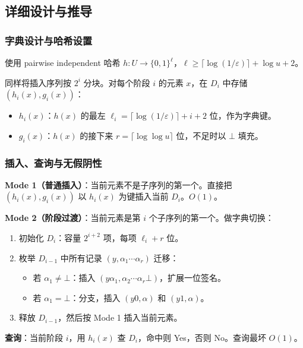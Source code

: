 \documentclass[UTF8,11pt,a4paper]{ctexart}
\begin{document}
\subsection{详细设计与推导}

\subsubsection{字典设计与哈希设置}

使用 pairwise independent 哈希 $h: U \to \{0,1\}^\ell$，$\ell \ge \lceil\log(1/\varepsilon)\rceil + \log u + 2$。

同样将插入序列按 $2^i$ 分块。对每个阶段 $i$ 的元素 $x$，在 $D_i$ 中存储 $(h_i(x), g_i(x))$：
\begin{itemize}
    \item $h_i(x)$：$h(x)$ 的最左 $\ell_i = \lceil\log(1/\varepsilon)\rceil + i + 2$ 位，作为字典键。
    \item $g_i(x)$：$h(x)$ 的接下来 $r = \lceil\log\log u\rceil$ 位，不足时以 $\bot$ 填充。
\end{itemize}

\subsubsection{插入、查询与无假阴性}

\textbf{Mode 1（普通插入）}：当前元素不是子序列的第一个。直接把 $(h_i(x), g_i(x))$ 以 $h_i(x)$ 为键插入当前 $D_i$。$O(1)$。

\textbf{Mode 2（阶段过渡）}：当前元素是第 $i$ 个子序列的第一个。做字典切换：
\begin{enumerate}
    \item 初始化 $D_i$：容量 $2^{i+2}$ 项，每项 $\ell_i + r$ 位。
    \item 枚举 $D_{i-1}$ 中所有记录 $(y, \alpha_1\cdots\alpha_r)$ 迁移：
    \begin{itemize}
        \item 若 $\alpha_1 \neq \bot$：插入 $(y\alpha_1, \alpha_2\cdots\alpha_r\bot)$，扩展一位签名。
        \item 若 $\alpha_1 = \bot$：分支，插入 $(y0, \alpha)$ 和 $(y1, \alpha)$。
    \end{itemize}
    \item 释放 $D_{i-1}$，然后按 Mode 1 插入当前元素。
\end{enumerate}

\textbf{查询}：当前阶段 $i$，用 $h_i(x)$ 查 $D_i$，命中则 Yes，否则 No。查询最坏 $O(1)$。
\end{document}
